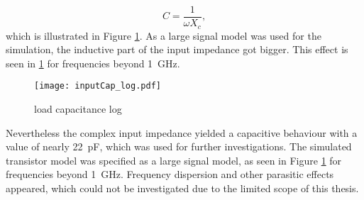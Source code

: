 \begin{equation}
	C = \frac{1}{\omega X_c},
\end{equation}
which is illustrated in Figure \ref{fig:inputCap_log}.
As a large signal model was used for the simulation, the inductive part of the input impedance got bigger.
This effect is seen in \ref{fig:inputCap_log} for frequencies beyond \SI{1}{\giga \hertz}.
\begin{figure}[ht]
	\centering
  \texttt{[image: inputCap\_log.pdf]}
	\caption{load capacitance log}
	\label{fig:inputCap_log}
\end{figure}

Nevertheless the complex input impedance yielded a capacitive behaviour with a value of nearly \SI{22}{\pico \farad}, which was used for further investigations.
The simulated transistor model was specified as a large signal model, as seen in Figure \ref{fig:inputCap_log} for frequencies beyond \SI{1}{\giga \hertz}.
Frequency dispersion and other parasitic effects appeared, which could not be investigated due to the limited scope of this thesis.

%
%
%



